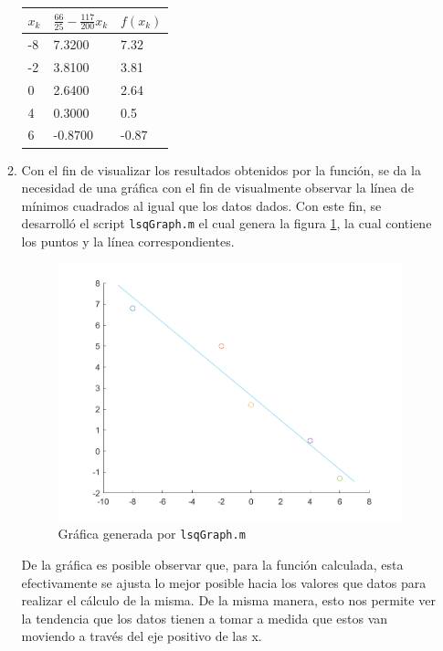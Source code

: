 \documentclass[english,notitlepage,letterpaper, 10pt]{article} %
\begin{document}
\begin{enumerate}
\begin{enumerate}
      \begin{table}[H]
        \centering
        \begin{tabular}{|l|l|l|}
        \hline
        $x_k$ & $\frac{66}{25} - \frac{117}{200}x_k$ & $f(x_k)$ \\ \hline
        -8 & 7.3200  & 7.32 \\ \hline
        -2 & 3.8100  & 3.81 \\ \hline
        0  & 2.6400  & 2.64 \\ \hline
        4  & 0.3000  & 0.5  \\ \hline
        6  & -0.8700 & -0.87 \\ \hline
        \end{tabular}
        \end{table}

      \item Con el fin de visualizar los resultados obtenidos por la función, se da la necesidad de una gráfica con el fin de visualmente observar la línea de mínimos cuadrados al igual que los datos dados. Con este fin, se desarrolló el script \texttt{lsqGraph.m} el cual genera la figura \ref{pic}, la cual contiene los puntos y la línea correspondientes.
      
      \begin{figure}[H]
        \centering
        \includegraphics{Images/lineas.png}
        \caption{Gráfica generada por \texttt{lsqGraph.m}}
        \label{pic}
      \end{figure}

      De la gráfica es posible observar que, para la función calculada, esta efectivamente se ajusta lo mejor posible hacia los valores que datos para realizar el cálculo de la misma. De la misma manera, esto nos permite ver la tendencia que los datos tienen a tomar a medida que estos van moviendo a través del eje positivo de las x.


\end{enumerate}
\end{enumerate}
\end{document}

